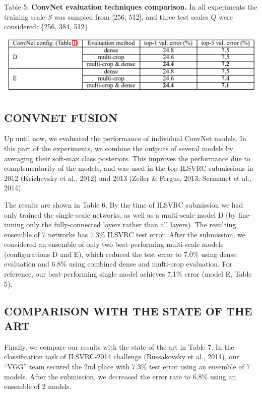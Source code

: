 \documentclass[12pt,a4paper,UTF8,twoside]{book}
\begin{document}
Table 5: \textbf{ConvNet evaluation techniques comparison.} In all experiments the training scale \(S\) was sampled from {[}256; 512{]}, and three test scales \(Q\) were considered: \{256, 384, 512\}.

\begin{center}\includegraphics[width=0.7\linewidth]{img/03-05} \end{center}

\hypertarget{convnet-fusion}{%
\subsection{CONVNET FUSION}\label{convnet-fusion}}

Up until now, we evaluated the performance of individual ConvNet models. In this part of the experiments, we combine the outputs of several models by averaging their soft-max class posteriors. This improves the performance due to complementarity of the models, and was used in the top ILSVRC submissions in 2012 (Krizhevsky et al., 2012) and 2013 (Zeiler \& Fergus, 2013; Sermanet et al., 2014).

The results are shown in Table 6. By the time of ILSVRC submission we had only trained the single-scale networks, as well as a multi-scale model D (by fine-tuning only the fully-connected layers rather than all layers). The resulting ensemble of 7 networks has 7.3\% ILSVRC test error. After the submission, we considered an ensemble of only two best-performing multi-scale models (configurations D and E), which reduced the test error to 7.0\% using dense evaluation and 6.8\% using combined dense and multi-crop evaluation. For reference, our best-performing single model achieves 7.1\% error (model E, Table 5).

\hypertarget{comparison-with-the-state-of-the-art}{%
\subsection{COMPARISON WITH THE STATE OF THE ART}\label{comparison-with-the-state-of-the-art}}

Finally, we compare our results with the state of the art in Table 7. In the classification task of ILSVRC-2014 challenge (Russakovsky et al., 2014), our ``VGG'' team secured the 2nd place with 7.3\% test error using an ensemble of 7 models. After the submission, we decreased the error rate to 6.8\% using an ensemble of 2 models.
\end{document}
